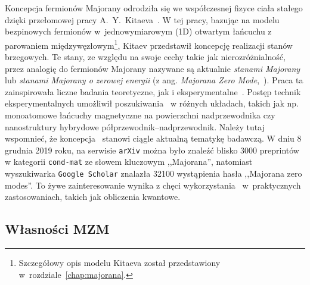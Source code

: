 Koncepcja fermionów Majorany odrodziła się we współczesnej fizyce ciała stałego dzięki przełomowej pracy A.~Y.~Kitaeva~\cite{kitaev.2001}. 
W tej pracy, bazując na modelu bezpinowych fermionów w~jednowymiarowym (1D) otwartym łańcuchu z parowaniem międzywęzłowym\footnote{Szczegółowy opis modelu Kitaeva został przedstawiony w~rozdziale~\ref{chap:majorana}.}, Kitaev przedstawił koncepcję realizacji stanów brzegowych.
Te stany, ze względu na swoje cechy takie jak nierozróżnialność, przez analogię do fermionów Majorany nazywane są aktualnie \textit{stanami Majorany} lub \textit{stanami Majorany o zerowej energii} (z ang. \textit{Majorana Zero Mode},~\MZM).
Praca ta zainspirowała liczne badania teoretyczne, jak i eksperymentalne~\cite{nayak.simon.2008,beenakker.2013,elliott.franz.2015,lutchyn.bakkers.2018,pawlak.hoffman.2019}.
Postęp technik eksperymentalnych umożliwił poszukiwania \MZM\ w różnych układach, takich jak np. monoatomowe łańcuchy magnetyczne na powierzchni nadprzewodnika czy nanostruktury hybrydowe półprzewodnik--nadprzewodnik.
Należy tutaj wspomnieć, że koncepcja \MZM\ stanowi ciągle aktualną tematykę badawczą. 
W dniu 8 grudnia 2019 roku, na serwisie \texttt{\normalsize arXiv} można było  znaleźć blisko 3000 preprintów w kategorii \texttt{\normalsize cond-mat} ze słowem kluczowym ,,Majorana'',
natomiast wyszukiwarka \texttt{\normalsize Google Scholar} znalazła 32100 wystąpienia hasła ,,Majorana zero modes''.
To żywe zainteresowanie wynika z chęci wykorzystania \MZM\ w~praktycznych zastosowaniach, takich jak obliczenia kwantowe.

\subsection*{Własności MZM}

